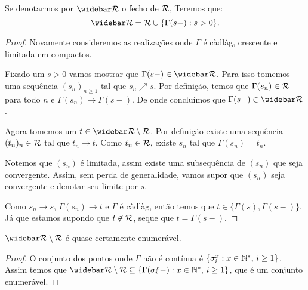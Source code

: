 \begin{proposicao}
  Se denotarmos por $\RRb$ o fecho de ${\mathcal{R}}$, Teremos que:
  \begin{displaymath}
    \RRb = \RR \cup \{ \Gamma(s-) : s > 0 \}.
  \end{displaymath}
\end{proposicao}
\begin{proof}
  Novamente consideremos as realizações onde $\Gamma$ é càdlàg, crescente
  e limitada em compactos.

  Fixado um $s > 0$ vamos mostrar que $\Gamma(s-) \in \RRb$. Para isso
  tomemos uma sequência $(s_n)_{n \geq 1}$ tal que $s_n \nearrow s$. Por
  definição, temos que $\Gamma(s_n) \in {\mathcal{R}}$ para todo $n$ e
  $\Gamma(s_n) \to \Gamma(s-)$. De onde concluímos que $\Gamma(s-) \in
  \RRb$.

  Agora tomemos um $t \in \RRb \setminus \RR$. Por definição existe uma
  sequência $(t_n)_n \in {\mathcal{R}}$ tal que $t_n \to t$. Como $t_n \in {\mathcal{R}}$,
  existe $s_n$ tal que $\Gamma(s_n) = t_n$.

  Notemos que $(s_n)$ é limitada, assim existe uma subsequência de
  $(s_n)$ que seja convergente. Assim, sem perda de generalidade, vamos
  supor que $(s_n)$ seja convergente e denotar seu limite por $s$.

  Como $s_n \to s$, $\Gamma(s_n) \to t$ e $\Gamma$ é càdlàg, então
  temos que $t \in \{ \Gamma(s), \Gamma(s-) \}$. Já que estamos
  supondo que $t \not\in {\mathcal{R}}$, seque que $t = \Gamma(s-)$.
\end{proof}

\begin{proposicao}
  $\RRb \setminus \RR$ é quase certamente enumerável.
\end{proposicao}
\begin{proof}
  O conjunto dos pontos onde $\Gamma$ não é contínua é $\{ \sigma_i^x:
  x \in {\mathbb{N^*}}, \, i \geq 1\}$. Assim temos que $\RRb \setminus \RR
  \subseteq \{ \Gamma(\sigma_i^x-): x \in \Nz, \, i \geq 1\}$, que é
  um conjunto enumerável.
\end{proof}

